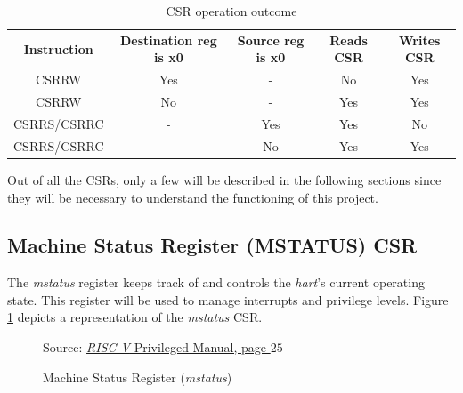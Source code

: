 \begin{table}
  \centering
  \begin{tabular}{|c|c|c|c|c|}
    \hline
    \textbf{Instruction} & \textbf{Destination reg is x0} & \textbf{Source reg is x0} & \textbf{Reads CSR} & \textbf{Writes CSR} \\
    \hhline{=====} CSRRW & Yes                            & -                         & No                 & Yes                 \\
    \hline
    CSRRW                & No                             & -                         & Yes                & Yes                 \\
    \hline
    CSRRS/CSRRC          & -                              & Yes                       & Yes                & No                  \\
    \hline
    CSRRS/CSRRC          & -                              & No                        & Yes                & Yes                 \\
    \hline
  \end{tabular}
  \caption{CSR operation outcome}
  \label{tab:csrop}
\end{table}

Out of all the CSRs, only a few will be described in the following sections since
they will be necessary to understand the functioning of this project.

\subsection{Machine Status Register (MSTATUS) CSR}
\label{subsec:mstatus}

The \textit{mstatus} register keeps track of and controls the \textit{hart}'s
current operating state. This register will be used to manage interrupts and privilege
levels. Figure \ref{fig:mstatus} depicts a representation of the \textit{mstatus}
CSR.

\begin{figure}[htbp]
  \centering
  \def\stackalignment{r} %
  {\scriptsize Source: \href{https://drive.google.com/file/d/17GeetSnT5wW3xNuAHI95-SI1gPGd5sJ_/view}{\textit{RISC-V} Privileged Manual, page $25$}}
  \caption{Machine Status Register (\textit{mstatus})}
  \label{fig:mstatus}
\end{figure}

